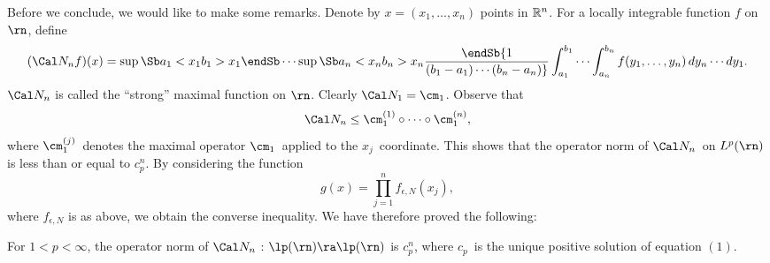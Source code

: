 Before we conclude, we would like to make some remarks.
 Denote by  $x=(x_1, \dots , x_n)$ points in $\Bbb R^n$.
For a locally integrable function $f$ on $\rn$, define
$$
(\Cal N_n f)(x) = \sup\Sb a_1< x_1\\  b_1 > x_1\endSb \cdots
\sup\Sb a_n< x_n\\  b_n > x_n\endSb
{1\over (b_1-a_1)\cdots(b_n-a_n)} \int_{a_1}^{b_1} \cdots \int_{a_n}^{b_n}
f(y_1,\dots,y_n) \,dy_n\cdots dy_1 .
$$
$\Cal N_n$ is called the ``strong'' maximal
function on $\rn$. Clearly $\Cal N_1=\cm_1$. Observe that
$$ \Cal N_n \le \cm_1^{(1)} \circ \cdots \circ \cm_1^{(n)} ,$$
where $\cm_1^{(j)}$\ denotes the maximal operator $\cm_1$\ applied
to the $x_j$\ coordinate. This shows that the operator norm of
$\Cal N_n$\ on $L^p(\rn)$ is less than or equal to $c_p^n$.
By  considering the function
$$ g(x) = \prod_{j=1}^n f_{\epsilon,N}(x_j) ,$$
where  $f_{\epsilon,N}$ is as above, we obtain the converse
inequality.
We have therefore proved the following:

For $1<p<\infty$, the operator norm of
$\Cal N_n$ : $\lp(\rn) \ra \lp(\rn)$ is $c_p^n$, where $c_p$\ is the
unique positive solution of equation $(1)$.
\endproclaim


\bigskip

